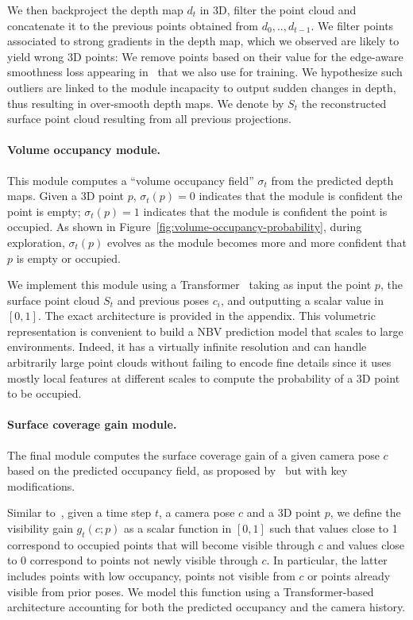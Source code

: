 We then backproject the depth map $d_t$ in 3D, filter the point cloud and concatenate it to the previous points obtained from $d_0, .., d_{t-1}$. We filter points associated to strong gradients in the depth map, which we observed are likely to yield wrong 3D points: We remove points based on their value for the edge-aware smoothness loss appearing in~\cite{watson-cvpr21-temporal-opportunist-manydepth,godard-cvpr17-unsupervisedmonoculardepth,heise-iccv13-pmhuber} that we also use for training. We hypothesize such outliers are linked to the module incapacity to output sudden changes in depth, thus resulting in over-smooth depth maps. We denote by $S_t$ the reconstructed surface point cloud resulting from all previous projections.

\paragraph{Volume occupancy module.} This module computes a ``volume occupancy field'' $\sigma_t$ from the predicted depth maps.
Given a 3D point $p$, $\sigma_t(p)=0$ indicates that the module is confident the point is empty; $\sigma_t(p)=1$ indicates that the module is confident the point is occupied. As shown in Figure~\ref{fig:volume-occupancy-probability}, during exploration, $\sigma_t(p)$ evolves as the module becomes more and more confident that $p$ is empty or occupied.

We implement this module using a Transformer~\cite{vaswani-nips17-attentionisallyouneed} taking as input the point $p$, the surface point cloud $S_t$ and previous poses $c_i$, and outputting a scalar value in $[0, 1]$. The exact architecture is provided in the appendix. This volumetric representation is convenient to build a NBV prediction model that scales to large environments. Indeed, it has a virtually infinite resolution and can handle arbitrarily large point clouds without failing to encode fine details since it uses mostly local features at different scales to compute the probability of a 3D point to be occupied. 

\paragraph{Surface coverage gain module.}
The final module computes the surface coverage gain of a given camera pose $c$ based on the predicted occupancy field, as proposed by~\cite{guedon-nips22-scone-surface-coverage} but with key modifications.

Similar to~\cite{guedon-nips22-scone-surface-coverage}, given a time step $t$, a camera pose $c$ and a 3D point $p$, we define the visibility gain $g_t(c;p)$ as a scalar function in $[0, 1]$ such that values close to 1 correspond to occupied points that will become visible through $c$ and values close to 0 correspond to points not newly visible through $c$. In particular, the latter includes points with low occupancy, points not visible from $c$ or points already visible from prior poses. We model this function using a Transformer-based architecture accounting for both the predicted occupancy and the camera history. 

